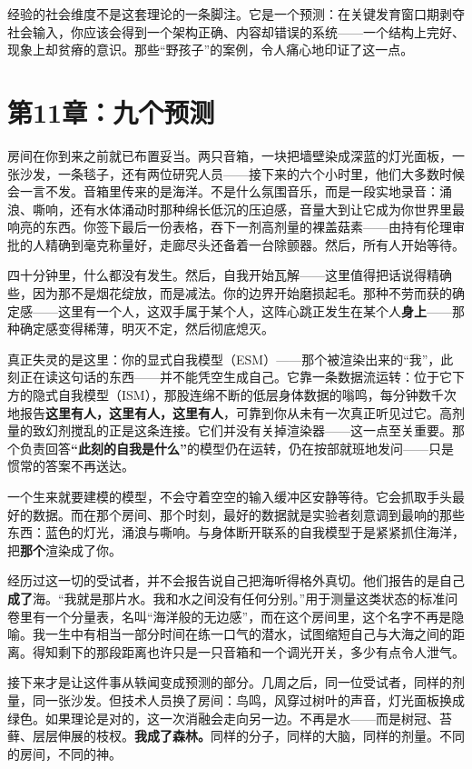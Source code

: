 \documentclass[11pt, twoside, openright]{book}
\begin{document}
经验的社会维度不是这套理论的一条脚注。它是一个预测：在关键发育窗口期剥夺社会输入，你应该会得到一个架构正确、内容却错误的系统------一个结构上完好、现象上却贫瘠的意识。那些“野孩子”的案例，令人痛心地印证了这一点。


\chapter*{第11章：九个预测}

房间在你到来之前就已布置妥当。两只音箱，一块把墙壁染成深蓝的灯光面板，一张沙发，一条毯子，还有两位研究人员------接下来的六个小时里，他们大多数时候会一言不发。音箱里传来的是海洋。不是什么氛围音乐，而是一段实地录音：涌浪、嘶响，还有水体涌动时那种绵长低沉的压迫感，音量大到让它成为你世界里最响亮的东西。你签下最后一份表格，吞下一剂高剂量的裸盖菇素------由持有伦理审批的人精确到毫克称量好，走廊尽头还备着一台除颤器。然后，所有人开始等待。

四十分钟里，什么都没有发生。然后，自我开始瓦解------这里值得把话说得精确些，因为那不是烟花绽放，而是减法。你的边界开始磨损起毛。那种不劳而获的确定感------这里有一个人，这双手属于某个人，这阵心跳正发生在某个人\textbf{身上}------那种确定感变得稀薄，明灭不定，然后彻底熄灭。

真正失灵的是这里：你的显式自我模型（ESM）------那个被渲染出来的“我”，此刻正在读这句话的东西------并不能凭空生成自己。它靠一条数据流运转：位于它下方的隐式自我模型（ISM），那股连绵不断的低层身体数据的嗡鸣，每分钟数千次地报告\textbf{这里有人，这里有人，这里有人}，可靠到你从未有一次真正听见过它。高剂量的致幻剂搅乱的正是这条连接。它们并没有关掉渲染器------这一点至关重要。那个负责回答\textbf{“此刻的自我是什么”}的模型仍在运转，仍在按部就班地发问------只是惯常的答案不再送达。

一个生来就要建模的模型，不会守着空空的输入缓冲区安静等待。它会抓取手头最好的数据。而在那个房间、那个时刻，最好的数据就是实验者刻意调到最响的那些东西：蓝色的灯光，涌浪与嘶响。与身体断开联系的自我模型于是紧紧抓住海洋，把\textbf{那个}渲染成了你。

经历过这一切的受试者，并不会报告说自己把海听得格外真切。他们报告的是自己\textbf{成了}海。“我就是那片水。我和水之间没有任何分别。”用于测量这类状态的标准问卷里有一个分量表，名叫“海洋般的无边感”，而在这个房间里，这个名字不再是隐喻。我一生中有相当一部分时间在练一口气的潜水，试图缩短自己与大海之间的距离。得知剩下的那段距离也许只是一只音箱和一个调光开关，多少有点令人泄气。

接下来才是让这件事从轶闻变成预测的部分。几周之后，同一位受试者，同样的剂量，同一张沙发。但技术人员换了房间：鸟鸣，风穿过树叶的声音，灯光面板换成绿色。如果理论是对的，这一次消融会走向另一边。不再是水------而是树冠、苔藓、层层伸展的枝杈。\textbf{我成了森林。}同样的分子，同样的大脑，同样的剂量。不同的房间，不同的神。
\end{document}
